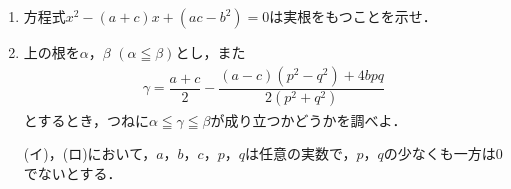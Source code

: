 \documentclass[../../main.tex]{subfiles}
\begin{document}
\begin{enumerate}
  \item[(イ)] 方程式$x^2-(a+c)x+(ac-b^2)=0$は実根をもつことを示せ．
  \item[(ロ)] 上の根を$\alpha$，$\beta$ $(\alpha\leqq\beta)$とし，また
    \begin{align*}
      \gamma=\dfrac{a+c}{2}-\dfrac{(a-c)(p^2-q^2)+4bpq}{2(p^2+q^2)}
    \end{align*}
    とするとき，つねに$\alpha\leqq\gamma\leqq\beta$が成り立つかどうかを調べよ．

    (イ)，(ロ)において，$a$，$b$，$c$，$p$，$q$は任意の実数で，$p$，$q$の少なくも一方は0でないとする．
\end{enumerate}
\end{document}
